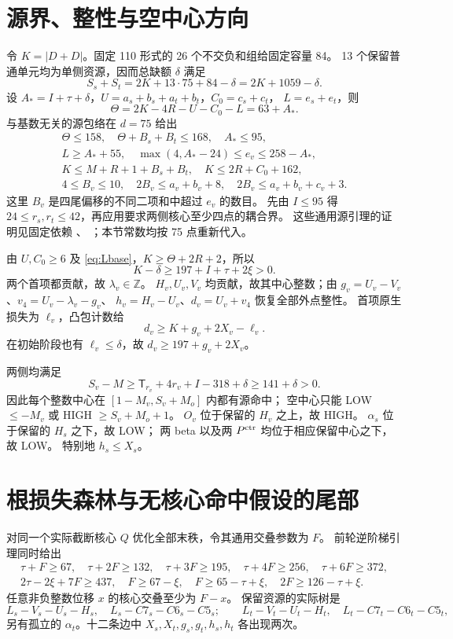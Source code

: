 \documentclass[11pt,a4paper]{article}
\newcommand{\Z}{\mathbb Z}
\newcommand{\T}{\mathsf T}
\newcommand{\A}{A_*}
\begin{document}
\section{源界、整性与空中心方向}
令 $K=|D+D|$。固定 110 形式的 26 个不交负和组给固定容量 84。
13 个保留普通单元均为单侧资源，因而总缺额 $\delta$ 满足
\[
 S_s+S_t=2K+13\cdot75+84-\delta=2K+1059-\delta.
\]
设 $\A=I+\tau+\delta$，$U=a_s+b_s+a_t+b_t$，$C_0=c_s+c_t$，
$L=e_s+e_t$，则
\[
 \Theta=2K-4R-U-C_0-L=63+\A.
\]
与基数无关的源包络在 $d=75$ 给出
\begin{gather}
 \Theta\le158,\quad \Theta+B_s+B_t\le168,\quad\A\le95,\label{eq:budget}\\
 L\ge\A+55,\quad \max(4,\A-24)\le e_v\le258-\A,\label{eq:Lbase}\\
 K\le M+R+1+B_s+B_t,\quad K\le2R+C_0+162,\label{eq:K}\\
 4\le B_v\le10,\quad 2B_v\le a_v+b_v+8,\quad
 2B_v\le a_v+b_v+c_v+3.\label{eq:quartet}
\end{gather}
这里 $B_v$ 是四尾偏移的不同二项和中超过 $e_v$ 的数目。
先由 $I\le95$ 得 $24\le r_s,r_t\le42$，再应用要求两侧核心至少四点的耦合界。
这些通用源引理的证明见固定依赖
、
；本节常数均按 75 点重新代入。

由 $U,C_0\ge6$ 及 \eqref{eq:Lbase}，$K\ge\Theta+2R+2$，所以
\begin{equation}K-\delta\ge197+I+\tau+2\xi>0.\label{eq:leadingbase}\end{equation}
两个首项都贡献，故 $\lambda_v\in\Z$。
$H_v,U_v,V_v$ 均贡献，故其中心整数；由
$g_v=U_v-V_v$、$v_4=U_v-\lambda_v-g_v$、
$h_v=H_v-U_v$、$d_v=U_v+v_4$ 恢复全部外点整性。
首项原生损失为 $\ell_v$，凸包计数给
\begin{equation}d_v\ge K+g_v+2X_v-\ell_v.\label{eq:leading}\end{equation}
在初始阶段也有 $\ell_v\le\delta$，故 $d_v\ge197+g_v+2X_v$。

两侧均满足
\[
 S_v-M\ge\T_{r_v}+4r_v+I-318+\delta\ge141+\delta>0.
\]
因此每个整数中心在 $[1-M_v,S_v+M_o]$ 内都有源命中；
空中心只能 LOW $\le-M_v$ 或 HIGH $\ge S_v+M_o+1$。
$O_v$ 位于保留的 $H_v$ 之上，故 HIGH。
$\alpha_s$ 位于保留的 $H_s$ 之下，故 LOW；
两 beta 以及两 $P^{\rm ctr}$ 均位于相应保留中心之下，故 LOW。
特别地 $h_s\le X_s$。

\section{根损失森林与无核心命中假设的尾部}
对同一个实际截断核心 $Q$ 优化全部末秩，令其通用交叠参数为 $F$。
前轮逆阶梯引理同时给出
\begin{gather*}
 \tau+F\ge67,\quad\tau+2F\ge132,\quad\tau+3F\ge195,\quad
 \tau+4F\ge256,\quad\tau+6F\ge372,\\
 2\tau-2\xi+7F\ge437,\quad
 F\ge67-\xi,\quad F\ge65-\tau+\xi,\quad2F\ge126-\tau+\xi.
\end{gather*}
任意非负整数位移 $x$ 的核心交叠至少为 $F-x$。
保留资源的实际树是
\[
 L_s-V_s-U_s-H_s,\quad L_s-C7_s-C6_s-C5_s;
 \qquad L_t-V_t-U_t-H_t,\quad L_t-C7_t-C6_t-C5_t,
\]
另有孤立的 $\alpha_t$。十二条边中
$X_s,X_t,g_s,g_t,h_s,h_t$ 各出现两次。
\end{document}

